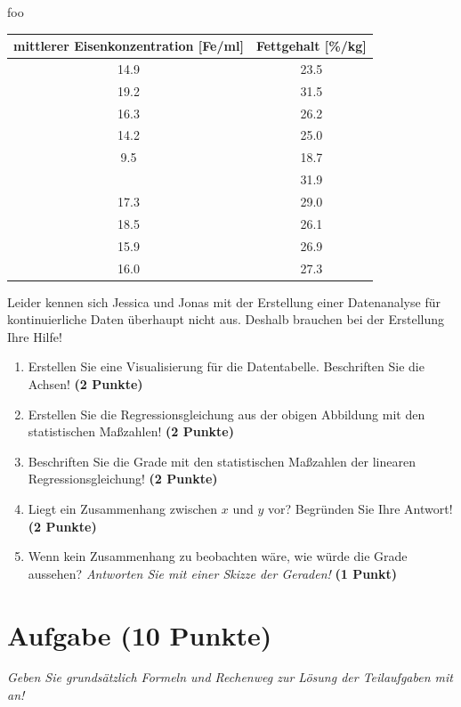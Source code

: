 \documentclass[a4paper, 9pt]{scrartcl}\usepackage[]{graphicx}\usepackage[]{xcolor}
\begin{document}
foo

\begin{table}[!h]
\centering
\begin{tabular}{cc}
\toprule
mittlerer Eisenkonzentration [Fe/ml] & Fettgehalt [\%/kg]\\
\midrule
14.9 & 23.5\\
19.2 & 31.5\\
16.3 & 26.2\\
14.2 & 25.0\\
9.5 & 18.7\\
\addlinespace
20.2 & 31.9\\
17.3 & 29.0\\
18.5 & 26.1\\
15.9 & 26.9\\
16.0 & 27.3\\
\bottomrule
\end{tabular}
\end{table}



Leider kennen sich Jessica und Jonas mit der Erstellung einer Datenanalyse für kontinuierliche Daten überhaupt nicht aus. Deshalb brauchen bei der Erstellung Ihre Hilfe!

\begin{enumerate}
\item Erstellen  Sie  eine  Visualisierung  für  die  Datentabelle.  Beschriften  Sie  die  Achsen! \textbf{(2 Punkte)}
\item Erstellen Sie die Regressionsgleichung aus der obigen Abbildung mit den statistischen Maßzahlen! \textbf{(2 Punkte)}
\item Beschriften Sie die Grade mit den statistischen Maßzahlen der linearen Regressionsgleichung! \textbf{(2 Punkte)}
\item Liegt ein Zusammenhang zwischen $x$ und $y$ vor? Begründen Sie Ihre Antwort! \textbf{(2 Punkte)}
\item Wenn kein Zusammenhang zu beobachten wäre, wie würde die Grade aussehen? \textit{Antworten Sie mit einer Skizze der Geraden!} \textbf{(1 Punkt)}
\end{enumerate} 
\clearpage

\section{Aufgabe \hfill (10 Punkte)}

\textit{Geben Sie grunds{\"a}tzlich Formeln und Rechenweg zur L{\"o}sung der
  Teilaufgaben mit an!} \\[1Ex]
\end{document}

